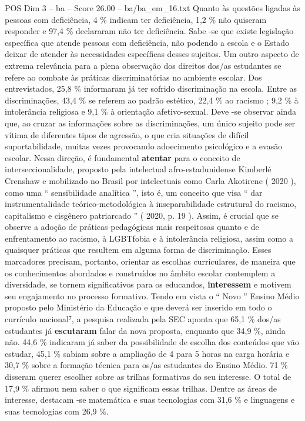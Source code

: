 \begin{textsample}{POS Dim 3 – ba – Score 26.00 – ba/ba\_em\_16.txt}
Quanto às questões ligadas às pessoas com deficiência, 4 \% indicam ter deficiência, 1,2 \% não quiseram responder e 97,4 \% declararam não ter deficiência.
Sabe -se que existe legislação específica que atende pessoas com deficiência, não podendo a escola e o Estado deixar de atender às necessidades específicas desses sujeitos.
Um outro aspecto de extrema relevância para a plena observação dos direitos dos/as estudantes se refere ao combate às práticas discriminatórias no ambiente escolar.
Dos entrevistados, 25,8 \% informaram já ter sofrido discriminação na escola.
Entre as discriminações, 43,4 \% se referem ao padrão estético, 22,4 \% ao racismo ; 9,2 \% à intolerância religiosa e 9,1 \% à orientação afetivo-sexual.
Deve -se observar ainda que, ao cruzar as informações sobre as discriminações, um único sujeito pode ser vítima de diferentes tipos de agressão, o que cria situações de difícil suportabilidade, muitas vezes provocando adoecimento psicológico e a evasão escolar.
Nessa direção, é fundamental \textbf{atentar} para o conceito de interseccionalidade, proposto pela intelectual afro-estadunidense Kimberlé Crenshaw e mobilizado no Brasil por intelectuais como Carla Akotirene ( 2020 ), como uma “ sensibilidade analítica ”, isto é, um conceito que visa “ dar instrumentalidade teórico-metodológica à inseparabilidade estrutural do racismo, capitalismo e cisgênero patriarcado ” ( 2020, p. 19 ).
Assim, é crucial que se observe a adoção de práticas pedagógicas mais respeitosas quanto e de enfrentamento ao racismo, à LGBTfobia e à intolerância religiosa, assim como a quaisquer práticas que resultem em alguma forma de discriminação.
Esses marcadores precisam, portanto, orientar as escolhas curriculares, de maneira que os conhecimentos abordados e construídos no âmbito escolar contemplem a diversidade, se tornem significativos para os educandos, \textbf{interessem} e motivem seu engajamento no processo formativo.
Tendo em vista o “ Novo ” Ensino Médio proposto pelo Ministério da Educação e que deverá ser inserido em todo o currículo nacional⁷, a pesquisa realizada pela SEC aponta que 65,1 \% dos/as estudantes já \textbf{escutaram} falar da nova proposta, enquanto que 34,9 \%, ainda não. 44,6 \% indicaram já saber da possibilidade de escolha dos conteúdos que vão estudar, 45,1 \% sabiam sobre a ampliação de 4 para 5 horas na carga horária e 30,7 \% sobre a formação técnica para os/as estudantes do Ensino Médio. 71 \% disseram querer escolher sobre as trilhas formativas do seu interesse.
O total de 17,9 \% afirmou nem saber o que significam essas trilhas.
Dentre as áreas de interesse, destacam -se matemática e suas tecnologias com 31,6 \% e linguagens e suas tecnologias com 26,9 \%.

\end{textsample}
